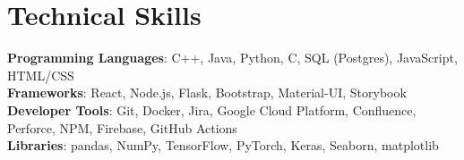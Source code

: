 \documentclass[letterpaper,11pt]{article}
\newcommand{\resumeItem}[1]{
  \item\small{
    {#1 \vspace{-2pt}}
  }
}
\newcommand{\resumeItemListStart}{\begin{itemize}}
\newcommand{\resumeItemListEnd}{\end{itemize}\vspace{-5pt}}
\begin{document}
\section{\textbf{Technical Skills}}
 \begin{itemize}[leftmargin=0.15in, label={}]
    \small{\item{
     \textbf{Programming Languages}{: C++, Java, Python, C, SQL (Postgres), JavaScript, HTML/CSS} \\
     \textbf{Frameworks}{: React, Node.js, Flask, Bootstrap, Material-UI, Storybook } \\
     \textbf{Developer Tools}{: Git, Docker, Jira, Google Cloud Platform, Confluence, Perforce, NPM, Firebase, GitHub Actions } \\
     \textbf{Libraries}{: pandas, NumPy, TensorFlow, PyTorch, Keras, Seaborn, matplotlib } \\
    }}
 \end{itemize}


\end{document}
